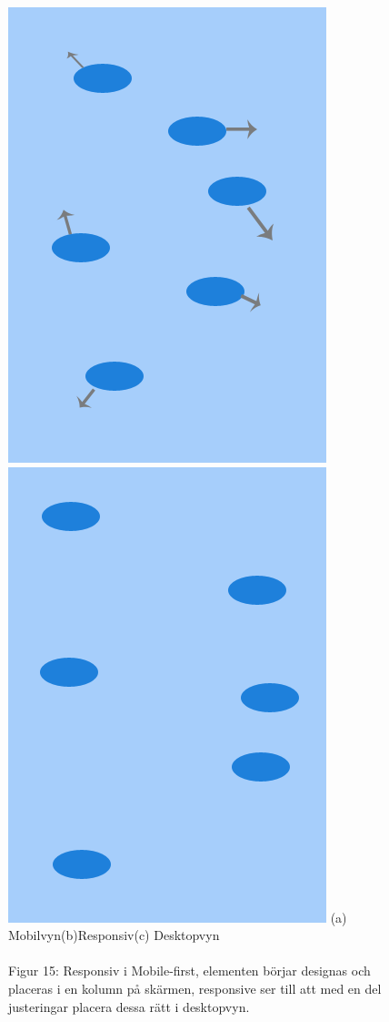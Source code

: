 \documentclass[11pt]{article}
\begin{document}
\begin{figure}[H]
{\includegraphics[scale=0.27]{pics/responsiv.png}\hspace{2em}%
\includegraphics[scale=0.27]{pics/desktop.png}%
}
\hspace{2cm}(a) Mobilvyn\hspace{2.3cm}(b)Responsiv\hspace{2.1cm}(c) Desktopvyn
\\\\
\hspace{0.15cm}Figur 15: Responsiv i Mobile-first, elementen börjar designas och placeras i en kolumn på skärmen, responsive ser till att med en del justeringar placera dessa rätt i desktopvyn.
\end{figure}
\end{document}
